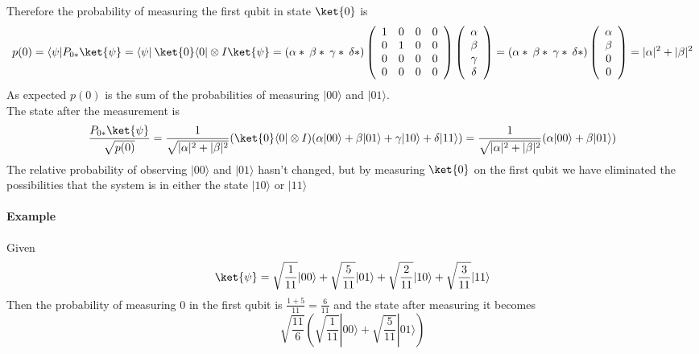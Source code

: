 \documentclass[10pt]{report}
\begin{document}
Therefore the probability of measuring the first qubit in state $\ket{0}$ is $$p(0) = \langle\psi|P_{0*}\ket{\psi} = \langle\psi|\:\ket{0}\langle0|\otimes I\ket{\psi} = (\alpha*\:\beta*\:\gamma*\:\delta*)\left(\begin{array}{c c c c}
1&0&0&0\\
0&1&0&0\\
0&0&0&0\\
0&0&0&0
\end{array}\right)\left(\begin{array}{c}
\alpha\\\beta\\\gamma\\\delta
\end{array}\right) =(\alpha*\:\beta*\:\gamma*\:\delta*)\left(\begin{array}{c}
\alpha\\\beta\\0\\0
\end{array}\right) = |\alpha|^2+|\beta|^2$$
As expected $p(0)$ is the sum of the probabilities of measuring $|00\rangle$ and $|01\rangle$.\\
The state after the measurement is 
$$\frac{P_{0*}\ket{\psi}}{\sqrt{p(0)}} = \frac{1}{\sqrt{|\alpha|^2+|\beta|^2}} (\ket{0}\langle0|\otimes I)(\alpha|00\rangle + \beta|01\rangle + \gamma|10\rangle + \delta|11\rangle) = \frac{1}{\sqrt{|\alpha|^2+|\beta|^2}}(\alpha|00\rangle+\beta|01\rangle)$$
The relative probability of observing $|00\rangle$ and $|01\rangle$ hasn't changed, but by measuring $\ket{0}$ on the first qubit we have eliminated the possibilities that the system is in either the state $|10\rangle$ or $|11\rangle$
\paragraph{Example} Given $$\ket{\psi}=\sqrt{\frac{1}{11}}|00\rangle+\sqrt{\frac{5}{11}}|01\rangle+\sqrt{\frac{2}{11}}|10\rangle+\sqrt{\frac{3}{11}}|11\rangle$$
Then the probability of measuring $0$ in the first qubit is $\frac{1 + 5}{11} = \frac{6}{11}$ and the state after measuring it becomes
$$\sqrt{\frac{11}{6}}\left(\sqrt{\frac{1}{11}}|00\rangle+\sqrt{\frac{5}{11}}|01\rangle\right)$$
\end{document}

